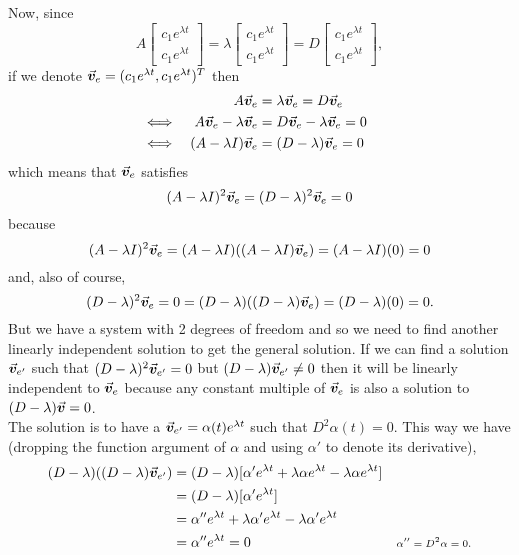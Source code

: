 \documentclass[../MathsNotesBase.tex]{subfiles}
\begin{document}
{		Now, since
		\[ A \begin{bmatrix}c_1 e^{\lambda t}\\ c_1 e^{\lambda t}\end{bmatrix} = \lambda \begin{bmatrix}c_1 e^{\lambda t}\\ c_1 e^{\lambda t}\end{bmatrix} = D \begin{bmatrix}c_1 e^{\lambda t}\\ c_1 e^{\lambda t}\end{bmatrix},  \]
		if we denote ${ \vec{\bm{v}}_e = (c_1 e^{\lambda t}, c_1 e^{\lambda t})^T }$ then
		\[\begin{aligned}
			&& A\vec{\bm{v}}_e &= \lambda \vec{\bm{v}}_e = D \vec{\bm{v}}_e \\
			&\iff & A\vec{\bm{v}}_e - \lambda \vec{\bm{v}}_e  &= D \vec{\bm{v}}_e - \lambda \vec{\bm{v}}_e = 0 &\text{\scriptsize{}} \\
			&\iff & (A - \lambda I) \vec{\bm{v}}_e  &= (D - \lambda) \vec{\bm{v}}_e = 0 &\text{\scriptsize{}} \\
		\end{aligned}\]
		which means that $\vec{\bm{v}}_e$ satisfies
		\[ (A - \lambda I)^2 \vec{\bm{v}}_e  = (D - \lambda)^2 \vec{\bm{v}}_e = 0 \]
		because
		\[ (A - \lambda I)^2 \vec{\bm{v}}_e = (A - \lambda I)((A - \lambda I) \vec{\bm{v}}_e) = (A - \lambda I)(0) = 0 \]
		and, also of course,
		\[ (D - \lambda)^2 \vec{\bm{v}}_e = 0 = (D - \lambda)((D - \lambda) \vec{\bm{v}}_e) = (D - \lambda)(0) = 0. \]
		But we have a system with 2 degrees of freedom and so we need to find another linearly independent solution to get the general solution. If we can find a solution $\vec{\bm{v}}_{e'}$ such that ${ (D - \lambda)^2 \vec{\bm{v}}_{e'} = 0 }$ but ${ (D - \lambda) \vec{\bm{v}}_{e'} \neq 0 }$ then it will be linearly independent to $\vec{\bm{v}}_e$ because any constant multiple of $\vec{\bm{v}}_e$ is also a solution to ${ (D - \lambda) \vec{\bm{v}} = 0 }$.\\
		
		The solution is to have a ${ \vec{\bm{v}}_{e'} = \alpha(t) e^{\lambda t} }$ such that ${ D^2 \alpha(t) = 0 }$. This way we have (dropping the function argument of $\alpha$ and using $\alpha'$ to denote its derivative),
		\[\begin{aligned}
			(D - \lambda)((D - \lambda) \vec{\bm{v}}_{e'}) &= (D - \lambda)[ \alpha' e^{\lambda t} + \lambda \alpha e^{\lambda t} - \lambda \alpha e^{\lambda t} ] \\
			&= (D - \lambda)[ \alpha' e^{\lambda t} ] &\text{\scriptsize{}} \\
			&= \alpha'' e^{\lambda t} + \lambda \alpha' e^{\lambda t} - \lambda \alpha' e^{\lambda t} &\text{\scriptsize{}} \\
			&= \alpha'' e^{\lambda t} = 0 &\text{\scriptsize{${ \alpha'' = D^2 \alpha = 0 }$.}} \\
		\end{aligned}\]
	
}
\end{document}
